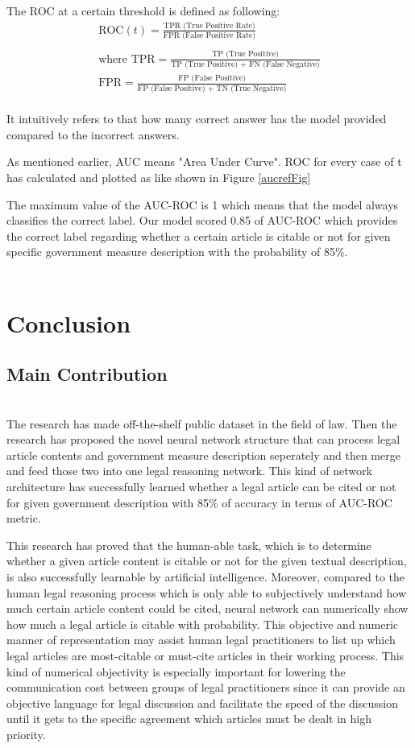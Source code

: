 \documentclass[sigconf]{acmart}
\begin{document}
The ROC at a certain threshold is defined as following:
\begin{gather*}
    \text{ROC} (t) = \frac{\text{TPR (True Positive Rate)}}{\text{FPR (False Positive Rate)}}\\\\
    \text{where } \text{TPR} = \frac{\text{TP (True Positive)}}{\text{TP (True Positive) + FN (False Negative)}}\\
    \text{FPR} = \frac{\text{FP (False Positive)}}{\text{FP (False Positive) + TN (True Negative)}}
\end{gather*}\\
It intuitively refers to that how many correct answer has the model provided compared to the incorrect answers. 

As mentioned earlier, AUC means "Area Under Curve". ROC for every case of t has calculated and plotted as like shown in  Figure \ref{aucrefFig}

The maximum value of the AUC-ROC is 1 which means that the model always classifies the correct label. Our model scored 0.85 of AUC-ROC which provides the correct label regarding whether a certain article is citable or not for given specific government measure description with the probability of 85\%.\\\\
\section{Conclusion}
\subsection{Main Contribution}\\
The research has made off-the-shelf public dataset in the field of law. Then the research has proposed the novel neural network structure that can process legal article contents and government measure description seperately and then merge and feed those two into one legal reasoning network. This kind of network architecture has successfully learned whether a legal article can be cited or not for given government description with 85\% of accuracy in terms of AUC-ROC metric.


This research has proved that the human-able task, which is to determine whether a given article content is citable or not for the given textual description, is also successfully learnable by artificial intelligence. Moreover, compared to the human legal reasoning process which is only able to subjectively understand how much certain article content could be cited, neural network can numerically show how much a legal article is citable with probability. This objective and numeric manner of representation may assist human legal practitioners to list up which legal articles are most-citable or must-cite articles in their working process. This kind of numerical objectivity is especially important for lowering the communication cost between groups of legal practitioners since it can provide an objective language for legal discussion and facilitate the speed of the discussion until it gets to the specific agreement which articles must be dealt in high priority.  
\end{document}
